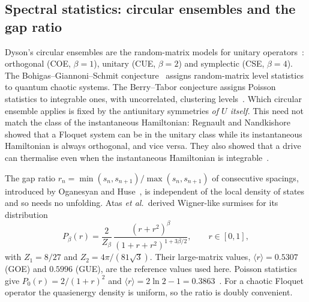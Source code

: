 \subsection{Spectral statistics: circular ensembles and the gap ratio}

Dyson's circular ensembles are the random-matrix models for unitary
operators~\cite{dyson1962}: orthogonal (COE, $\beta=1$), unitary (CUE,
$\beta=2$) and symplectic (CSE, $\beta=4$). The Bohigas--Giannoni--Schmit
conjecture~\cite{bgs1984} assigns random-matrix level statistics to quantum
chaotic systems. The Berry--Tabor conjecture assigns Poisson statistics to
integrable ones, with uncorrelated, clustering levels~\cite{berrytabor1977}.
Which circular ensemble applies is fixed by the antiunitary symmetries \emph{of
$U$ itself}. This need not match the class of the instantaneous Hamiltonian:
Regnault and Nandkishore showed that a Floquet system can be in the unitary
class while its instantaneous Hamiltonian is always orthogonal, and vice versa.
They also showed that a drive can thermalise even when the instantaneous
Hamiltonian is integrable~\cite{regnault2016}.

The gap ratio $r_n=\min(s_n,s_{n+1})/\max(s_n,s_{n+1})$ of consecutive
spacings, introduced by Oganesyan and Huse~\cite{oganesyan2007}, is independent
of the local density of states and so needs no unfolding. Atas \emph{et al.}\
derived Wigner-like surmises for its distribution
\begin{equation}
  P_\beta(r)=\frac{2}{Z_\beta}\,\frac{(r+r^2)^\beta}{(1+r+r^2)^{1+3\beta/2}},
  \qquad r\in[0,1],
  \label{eq:surmise}
\end{equation}
with $Z_1=8/27$ and $Z_2=4\pi/(81\sqrt3)$. Their large-matrix values,
$\langle r\rangle=0.5307$ (GOE) and $0.5996$ (GUE), are the reference values
used here. Poisson statistics give $P_0(r)=2/(1+r)^2$ and
$\langle r\rangle=2\ln2-1=0.3863$~\cite{atas2013}. For a chaotic Floquet
operator the quasienergy density is uniform, so the ratio is doubly convenient.

